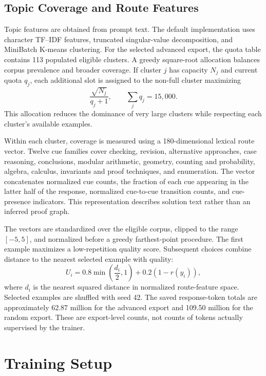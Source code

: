 \documentclass[11pt,letterpaper]{article}
\begin{document}
\subsection{Topic Coverage and Route Features}
Topic features are obtained from prompt text. The default implementation uses character TF--IDF features, truncated singular-value decomposition, and MiniBatch K-means clustering. For the selected advanced export, the quota table contains 113 populated eligible clusters. A greedy square-root allocation balances corpus prevalence and broader coverage. If cluster $j$ has capacity $N_j$ and current quota $q_j$, each additional slot is assigned to the non-full cluster maximizing
\begin{equation}
 \frac{\sqrt{N_j}}{q_j+1}, \qquad \sum_j q_j=15{,}000.
\end{equation}
This allocation reduces the dominance of very large clusters while respecting each cluster's available examples.

Within each cluster, coverage is measured using a 180-dimensional lexical route vector. Twelve cue families cover checking, revision, alternative approaches, case reasoning, conclusions, modular arithmetic, geometry, counting and probability, algebra, calculus, invariants and proof techniques, and enumeration. The vector concatenates normalized cue counts, the fraction of each cue appearing in the latter half of the response, normalized cue-to-cue transition counts, and cue-presence indicators. This representation describes solution text rather than an inferred proof graph.

The vectors are standardized over the eligible corpus, clipped to the range $[-5,5]$, and normalized before a greedy farthest-point procedure. The first example maximizes a low-repetition quality score. Subsequent choices combine distance to the nearest selected example with quality:
\begin{equation}
 U_i=0.8\min\!\left(\frac{d_i}{2},1\right)+0.2(1-r(y_i)),
\end{equation}
where $d_i$ is the nearest squared distance in normalized route-feature space. Selected examples are shuffled with seed 42. The saved response-token totals are approximately 62.87 million for the advanced export and 109.50 million for the random export. These are export-level counts, not counts of tokens actually supervised by the trainer.

\section{Training Setup}
\end{document}
